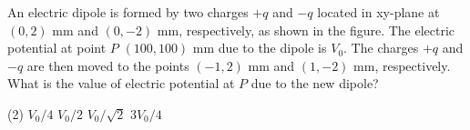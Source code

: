 \item An electric dipole is formed by two charges \(+q\) and \(-q\) located in xy-plane at \((0,2)\) mm and \((0,-2)\) mm, respectively, as shown in the figure. The electric potential at point \(P\) \((100,100)\) mm due to the dipole is \(V_0\). The charges \(+q\) and \(-q\) are then moved to the points \((-1,2)\) mm and \((1,-2)\) mm, respectively. What is the value of electric potential at \(P\) due to the new dipole?
        \begin{tasks}(2)
        	\task \(V_0/4\)
        	\task \(V_0/2\)
        	\task \(V_0/\sqrt{2}\)
        	\task \(3V_0/4\)
        \end{tasks}